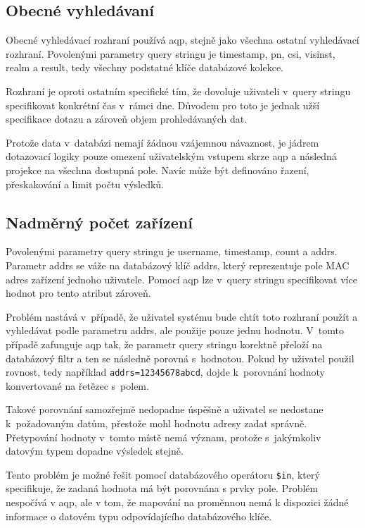 \documentclass[thesis=M,czech]{FITthesis}[2012/06/26]
\begin{document}
    \subsection{Obecné vyhledávaní}
    
      Obecné vyhledávací rozhraní používá aqp,
      stejně jako všechna ostatní vyhledávací rozhraní.
      Povolenými parametry query stringu je timestamp, pn, csi, visinst, realm a result,
      tedy všechny podstatné klíče databázové kolekce.

      Rozhraní je oproti ostatním specifické tím, 
      že dovoluje uživateli v~query stringu specifikovat konkrétní čas v~rámci dne.
      Důvodem pro toto je jednak užší specifikace dotazu a zároveň objem prohledávaných dat.

      Protože data v~databázi nemají žádnou vzájemnou návaznost,
      je jádrem dotazovací logiky pouze omezení uživatelským vstupem skrze aqp
      a následná projekce na všechna dostupná pole.
      Navíc může být definováno řazení, přeskakování a limit počtu výsledků.

    \subsection{Nadměrný počet zařízení}

      Povolenými parametry query stringu je username, timestamp, count a addrs.
      Parametr addrs se váže na databázový klíč addrs, který reprezentuje
      pole MAC adres zařízení jednoho uživatele.
      Pomocí aqp lze v~query stringu specifikovat více hodnot pro tento atribut zároveň.

      Problém nastává v~případě, že uživatel systému bude chtít toto
      rozhraní použít a vyhledávat podle parametru addrs, ale použije pouze jednu hodnotu.
      V~tomto případě zafunguje aqp tak, že parametr query stringu korektně přeloží
      na databázový filtr a ten se následně porovná s~hodnotou.
      Pokud by uživatel použil rovnost, tedy například \verb|addrs=12345678abcd|,
      dojde k~porovnání hodnoty konvertované na řetězec s~polem.

      Takové porovnání samozřejmě nedopadne úspěšně a uživatel se nedostane
      k~požadovaným datům, přestože mohl hodnotu adresy zadat správně.
      Přetypování hodnoty v~tomto místě nemá význam, protože s~jakýmkoliv datovým typem dopadne výsledek stejně.

      Tento problém je možné řešit pomocí databázového operátoru \verb|$in|,
      který specifikuje, že zadaná hodnota má být porovnána s prvky pole.
      Problém nespočívá v aqp, ale v tom, že
      mapování na proměnnou nemá k dispozici žádné informace o datovém typu odpovídajícího databázového klíče.
\end{document}
